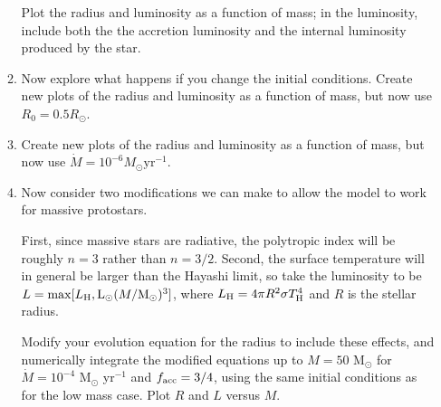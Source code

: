 \documentclass{article}
\newcommand{\msun}{\ensuremath{\mathrm{M}_\odot}\xspace}
\newcommand{\lsun}{\ensuremath{\mathrm{L}_\odot}\xspace}
\begin{document}
\begin{enumerate}
\begin{enumerate}
    Plot the radius and luminosity as
    a function of mass; in the luminosity, include both the the accretion
    luminosity and the internal luminosity produced by the star.
\item Now explore what happens if you change the initial conditions.
    Create new plots of the radius and luminosity as a function of mass, but now
    use $R_0=0.5 R_\odot$. 
\item 
    Create new plots of the radius and luminosity as a function of mass, but now
    use $\dot{M}=10^{-6} M_\odot \mathrm{yr}^{-1}$. 
\item Now consider two modifications we can make to allow the model to work
for massive protostars.

First, since massive stars are radiative, the
polytropic index will be roughly $n=3$ rather than $n=3/2$. Second, the
surface temperature will in general be larger than the Hayashi limit, so take
the luminosity to be $L=\max[L_{\rm H}, \lsun(M/\msun)^3]$, where $L_{\rm
H}=4\pi R^2 \sigma T_{\rm H}^4$ and $R$ is the stellar radius.

Modify your
evolution equation for the radius to include these effects, and numerically
integrate the modified equations up to $M=50$ $\msun$ for $\dot{M} = 10^{-4}$
$\msun$ yr$^{-1}$ and $f_{\rm acc}=3/4$, using the same initial conditions as
for the low mass case. Plot $R$ and $L$ versus $M$.
\end{enumerate}



% 


\end{enumerate}
\end{document}
